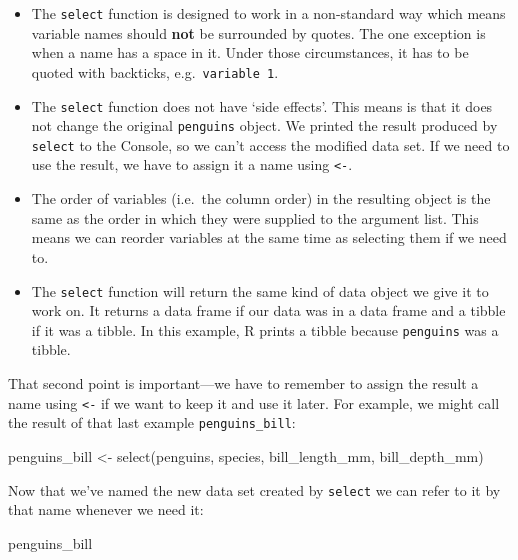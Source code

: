 \documentclass[
]{book}
\newenvironment{Shaded}{\begin{snugshade}}{\end{snugshade}}
\newcommand{\FunctionTok}[1]{\textcolor[rgb]{0.00,0.00,0.00}{#1}}
\newcommand{\NormalTok}[1]{#1}
\newcommand{\OtherTok}[1]{\textcolor[rgb]{0.56,0.35,0.01}{#1}}
\providecommand{\tightlist}{%
  \setlength{\itemsep}{0pt}\setlength{\parskip}{0pt}}
\begin{document}
\begin{itemize}
\tightlist
\item
  The \texttt{select} function is designed to work in a non-standard way which means variable names should \textbf{not} be surrounded by quotes. The one exception is when a name has a space in it. Under those circumstances, it has to be quoted with backticks, e.g.~\texttt{\textasciigrave{}variable\ 1\textasciigrave{}}.
\item
  The \texttt{select} function does not have `side effects'. This means is that it does not change the original \texttt{penguins} object. We printed the result produced by \texttt{select} to the Console, so we can't access the modified data set. If we need to use the result, we have to assign it a name using \texttt{\textless{}-}.
\item
  The order of variables (i.e.~the column order) in the resulting object is the same as the order in which they were supplied to the argument list. This means we can reorder variables at the same time as selecting them if we need to.
\item
  The \texttt{select} function will return the same kind of data object we give it to work on. It returns a data frame if our data was in a data frame and a tibble if it was a tibble. In this example, R prints a tibble because \texttt{penguins} was a tibble.
\end{itemize}

That second point is important---we have to remember to assign the result a name using \texttt{\textless{}-} if we want to keep it and use it later. For example, we might call the result of that last example \texttt{penguins\_bill}:

\begin{Shaded}
\begin{Highlighting}[]
\NormalTok{penguins\_bill }\OtherTok{\textless{}{-}} \FunctionTok{select}\NormalTok{(penguins, species, bill\_length\_mm, bill\_depth\_mm)}
\end{Highlighting}
\end{Shaded}

Now that we've named the new data set created by \texttt{select} we can refer to it by that name whenever we need it:

\begin{Shaded}
\begin{Highlighting}[]
\NormalTok{penguins\_bill}
\end{Highlighting}
\end{Shaded}
\end{document}
